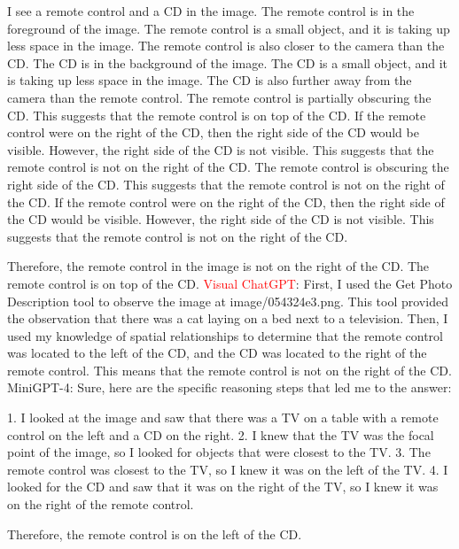 \begin{enumerate}
    I see a remote control and a CD in the image.
    The remote control is in the foreground of the image. The remote control is a small object, and it is taking up less space in the image. The remote control is also closer to the camera than the CD.
    The CD is in the background of the image. The CD is a small object, and it is taking up less space in the image. The CD is also further away from the camera than the remote control.
    The remote control is partially obscuring the CD. This suggests that the remote control is on top of the CD.
    If the remote control were on the right of the CD, then the right side of the CD would be visible. However, the right side of the CD is not visible. This suggests that the remote control is not on the right of the CD.
    The remote control is obscuring the right side of the CD. This suggests that the remote control is not on the right of the CD. If the remote control were on the right of the CD, then the right side of the CD would be visible. However, the right side of the CD is not visible. This suggests that the remote control is not on the right of the CD.
    
    Therefore, the remote control in the image is not on the right of the CD. The remote control is on top of the CD.
    \subitem \textcolor{red}{Visual ChatGPT}: First, I used the Get Photo Description tool to observe the image at image/054324e3.png. This tool provided the observation that there was a cat laying on a bed next to a television. Then, I used my knowledge of spatial relationships to determine that the remote control was located to the left of the CD, and the CD was located to the right of the remote control. This means that the remote control is not on the right of the CD.
    \subitem MiniGPT-4: Sure, here are the specific reasoning steps that led me to the answer:

    1. I looked at the image and saw that there was a TV on a table with a remote control on the left and a CD on the right.
    2. I knew that the TV was the focal point of the image, so I looked for objects that were closest to the TV.
    3. The remote control was closest to the TV, so I knew it was on the left of the TV.
    4. I looked for the CD and saw that it was on the right of the TV, so I knew it was on the right of the remote control.
    
    Therefore, the remote control is on the left of the CD.
\end{enumerate}
